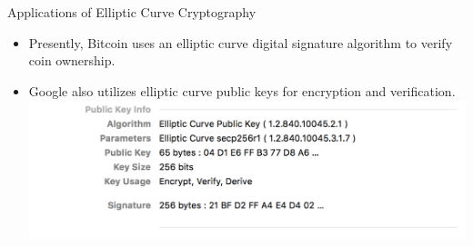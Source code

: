 \documentclass{beamer}
\begin{document}
	\begin{frame}{Applications of Elliptic Curve Cryptography}
		\begin{itemize}
			\item Presently, Bitcoin uses an elliptic curve digital signature algorithm to verify coin ownership.
			\item Google also utilizes elliptic curve public keys for encryption and verification.
			\newline \includegraphics[scale=.5]{Google.png}
		\end{itemize}
	\end{frame}
\end{document}
